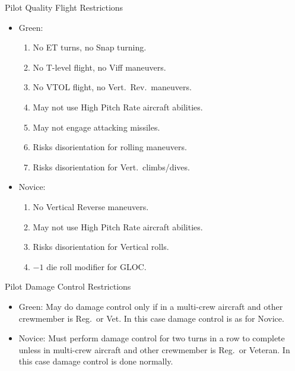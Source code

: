 \begin{table}

\centering

\caption{Pilot Quality Flight Restrictions}
\medskip

\begin{minipage}{1.0\linewidth}
\begin{itemize}[nosep]
    \item Green:
        \begin{enumerate}
            \item No ET turns, no Snap turning.
            \item No T-level flight, no Viff maneuvers.
            \item No VTOL flight, no Vert.\ Rev.\ maneuvers.
            \item May not use High Pitch Rate aircraft abilities.
            \item May not engage attacking missiles.
            \item Risks disorientation for rolling maneuvers.
            \item Risks disorientation for Vert.\ climbs/dives.
        \end{enumerate}
    \item Novice:
        \begin{enumerate}
            \item No Vertical Reverse maneuvers.
            \item May not use High Pitch Rate aircraft abilities.
            \item Risks disorientation for Vertical rolls.
            \item $-1$ die roll modifier for GLOC.
        \end{enumerate}
    \end{itemize}
\end{minipage}

\bigskip

\caption{Pilot Damage Control Restrictions}
\medskip

\begin{minipage}{1.0\linewidth}
\begin{itemize}[nosep]
    \item Green: May do damage control only if in a multi-crew aircraft and other crewmember is Reg.\ or Vet. In this case damage control is as for Novice.
    \item Novice: Must perform damage control for two turns in a row to complete unless in multi-crew aircraft and other crewmember is Reg.\ or Veteran. In this case damage control is done normally.
    \end{itemize}
\end{minipage}


\end{table}
